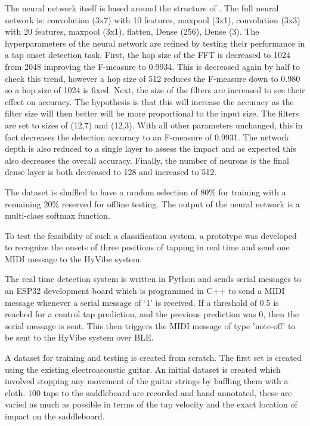 \documentclass[conference]{IEEEtran}
\begin{document}
The neural network itself is based around the structure of . The full neural network is: convolution (3x7) with 10 features, maxpool (3x1), convolution (3x3) with 20 features, maxpool (3x1), flatten, Dense (256), Dense (3).
The hyperparameters of the neural network are refined by testing their performance in a tap onset detection task. First, the hop size of the FFT is decreased to 1024 from 2048 improving the F-measure to 0.9934. This is decreased again by half to check this trend,
however a hop size of 512 reduces the F-measure down to 0.980 so a hop size of 1024 is fixed. Next, the size of the filters are increased to see their effect on accuracy. The hypothesis is that this will increase the accuracy as the filter size will then better
will be more proportional to the input size. The filters are set to sizes of (12,7) and (12,3). With all other parameters unchanged, this in fact decreases the detection accuracy to an F-measure of 0.9931. The network depth is also reduced to a single layer to assess the impact
and as expected this also decreases the overall accuracy. Finally, the number of neurons is the final dense layer is both decreased to 128 and increased to 512.

The dataset is shuffled to have a random selection of 80\% for training with a remaining 20\% reserved for offline testing. 
The output of the neural network is a multi-class softmax function. 

To test the feasibility of such a classification system, a prototype was developed to recognize the onsets of three positions of tapping in real time and send one MIDI message to the HyVibe system.

The real time detection system is written in Python and sends serial messages to an ESP32 development board which is programmed in C++ to send a MIDI message whenever a serial
message of `1' is received. If a threshold of 0.5 is reached for a control tap prediction, and the previous prediction was 0, then the serial message is sent.
This then triggers the MIDI message of type 'note-off' to be sent to the HyVibe system over BLE.

A dataset for training and testing is created from scratch. The first set is created using the existing electroacoustic guitar.
An initial dataset is created which involved stopping any movement of the guitar strings by baffling them with a cloth. 100 taps to the saddleboard are recorded and hand annotated, these are varied as much as possible
in terms of the tap velocity and the exact location of impact on the saddleboard.
\end{document}
